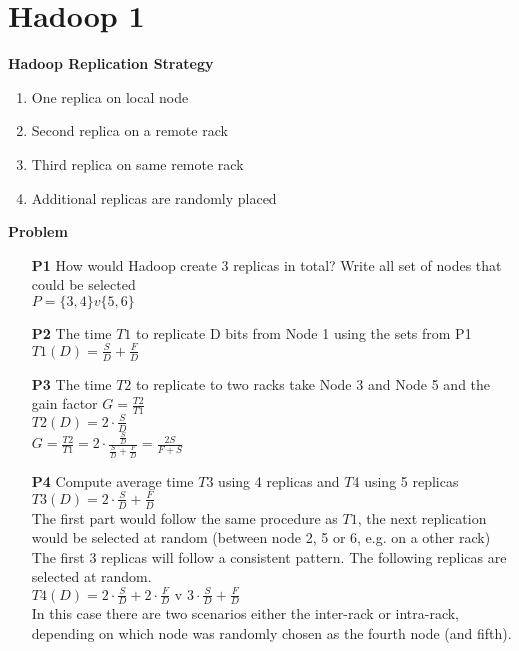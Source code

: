 \section{Hadoop 1}

\textbf{Hadoop Replication Strategy}
\begin{enumerate}
    \item One replica on local node
    \item Second replica on a remote rack
    \item Third replica on same remote rack
    \item Additional replicas are randomly placed
\end{enumerate}

\textbf{Problem}
\begin{itemize}
    \item[\textbf{P1}] How would Hadoop create 3 replicas in total? Write all set of nodes that could be selected\\
    $P = \{3,4\} v \{5,6\}$
    \item[\textbf{P2}] The time $T1$ to replicate D bits from Node 1 using the sets from P1\\
    $T1(D)=\frac{S}{D}+\frac{F}{D}$ 
    \item[\textbf{P3}] The time $T2$ to replicate to two racks take Node 3 and Node 5 and the gain factor $G=\frac{T2}{T1}$\\
    $T2(D)=2\cdot\frac{S}{D}$ \\
    $G=\frac{T2}{T1}=2\cdot\frac{\frac{S}{D}}{\frac{S}{D}+\frac{F}{D}}=\frac{2S}{F+S}$
    \item[\textbf{P4}] Compute average time $T3$ using 4 replicas and $T4$ using 5 replicas\\
    $T3(D)=2\cdot\frac{S}{D}+\frac{F}{D}$ \\
    The first part would follow the same procedure as $T1$, the next replication would be selected at random (between node 2, 5 or 6, e.g. on a other rack)
    The first 3 replicas will follow a consistent pattern. The following replicas are selected at random. \\
    $T4(D)=2\cdot\frac{S}{D}+2\cdot\frac{F}{D} \text{ v } 3\cdot\frac{S}{D}+\frac{F}{D}$ \\
    In this case there are two scenarios either the inter-rack or intra-rack, depending on which node was randomly chosen as the fourth node (and fifth).
\end{itemize}